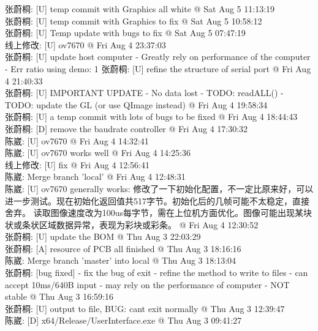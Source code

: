 \documentclass[a4paper]{paper}
\begin{document}
张蔚桐: [U] temp commit with Graphics all white @ Sat Aug 5 11:13:19\\ 
张蔚桐: [U] temp commit with Graphics to fix @ Sat Aug 5 10:58:12\\ 
张蔚桐: [U] Temp update with bugs to fix @ Sat Aug 5 07:47:19\\ 
线上修改: [U] ov7670 @ Fri Aug 4 23:37:03\\ 
张蔚桐: [U] update host computer     - Greatly rely on performance of the computer     - Err ratio using demo: 1%
张蔚桐: [U] refine the structure of serial port @ Fri Aug 4 21:40:33\\ 
张蔚桐: [U] IMPORTANT UPDATE     - No data lost     - TODO: readALL()     - TODO: update the GL (or use QImage instead) @ Fri Aug 4 19:58:34\\ 
张蔚桐: [U] a temp commit with lots of bugs to be fixed @ Fri Aug 4 18:44:43\\ 
张蔚桐: [D] remove the baudrate controller @ Fri Aug 4 17:30:32\\ 
陈崴: [U] ov7670 @ Fri Aug 4 14:32:41\\ 
陈崴: [U] ov7670 works well @ Fri Aug 4 14:25:36\\ 
线上修改: [U] fix @ Fri Aug 4 12:56:41\\  
陈崴: Merge branch 'local' @ Fri Aug 4 12:48:31\\ 
陈崴: [U] ov7670 generally works: 修改了一下初始化配置，不一定比原来好，可以进一步测试。现在初始化返回值共517字节。初始化后的几帧可能不太稳定，直接舍弃。 读取图像速度改为100us每字节，需在上位机方面优化。图像可能出现某块状或条状区域数据异常，表现为彩块或彩条。 @ Fri Aug 4 12:30:52\\ 
张蔚桐: [U] update the BOM @ Thu Aug 3 22:03:29\\ 
张蔚桐: [A] resource of PCB all finished @ Thu Aug 3 18:16:16\\ 
陈崴: Merge branch 'master' into local @ Thu Aug 3 18:13:04\\ 
张蔚桐: [bug fixed]     - fix the bug of exit     - refine the method to write to files     - can accept 10ms/640B input     - may rely on the performance of computer     - NOT stable @ Thu Aug 3 16:59:16\\ 
张蔚桐: [U] output to file, BUG: cant exit normally @ Thu Aug 3 12:39:47\\ 
陈崴: [D] x64/Release/UserInterface.exe @ Thu Aug 3 09:41:27\\ 
\end{document}
